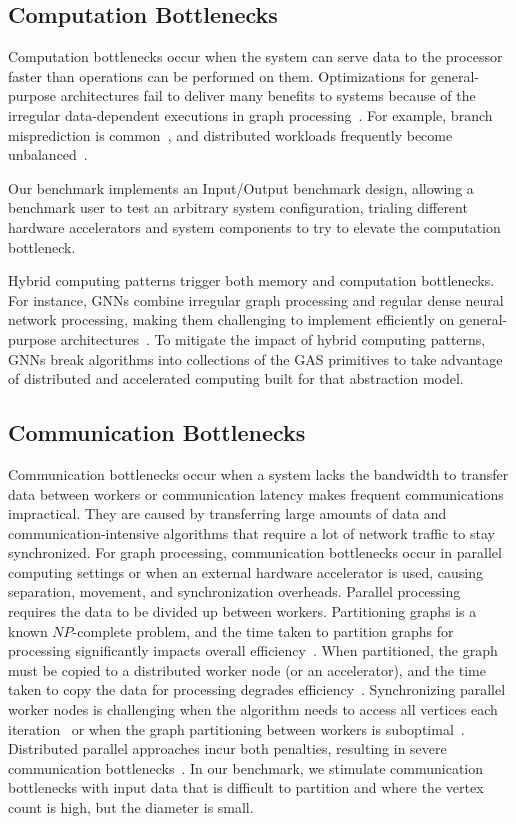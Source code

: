 \subsection{Computation Bottlenecks}
Computation bottlenecks occur when the system can serve data to the processor faster than operations can be performed on them. 
Optimizations for general-purpose architectures fail to deliver many benefits to \gai systems because of the irregular data-dependent executions in graph processing~\cite{Dadu2021}. 
For example, branch misprediction is common~\cite{Aananthakrishnan2020}, and distributed workloads frequently become unbalanced~\cite{Aananthakrishnan2020, Ozdal2017}.

Our \gai benchmark implements an Input/Output benchmark design, allowing a benchmark user to test an arbitrary system configuration, trialing different hardware accelerators and system components to try to elevate the computation bottleneck. 

Hybrid computing patterns trigger both memory and computation bottlenecks. 
For instance, \ac{GNN}s combine irregular graph processing and regular dense neural network processing, making them challenging to implement efficiently on general-purpose architectures~\cite{Yan2020}.
To mitigate the impact of hybrid computing patterns, \ac{GNN}s break algorithms into collections of the \ac{GAS} primitives to take advantage of distributed and accelerated computing built for that abstraction model.


\subsection{Communication Bottlenecks}
Communication bottlenecks occur when a system lacks the bandwidth to transfer data between workers or communication latency makes frequent communications impractical.
They are caused by transferring large amounts of data and communication-intensive algorithms that require a lot of network traffic to stay synchronized.
For graph processing, communication bottlenecks occur in parallel computing settings or when an external hardware accelerator is used, causing separation, movement, and synchronization overheads.
Parallel processing requires the data to be divided up between workers. 
Partitioning graphs is a known $NP$-complete problem, and the time taken to partition graphs for processing significantly impacts overall efficiency~\cite{Mccune2015}.
When partitioned, the graph must be copied to a distributed worker node (or an accelerator), and the time taken to copy the data for processing degrades efficiency~\cite{Mutlu2023, Kiningham2022}.
Synchronizing parallel worker nodes is challenging when the algorithm needs to access all vertices each iteration~\cite{Satish2014} or when the graph partitioning between workers is suboptimal~\cite{Chen2019}.
Distributed parallel approaches incur both penalties, resulting in severe communication bottlenecks~\cite{Beamer2015, Dhulipala2021}.
In our \gai benchmark, we stimulate communication bottlenecks with input data that is difficult to partition and where the vertex count is high, but the diameter is small. 

